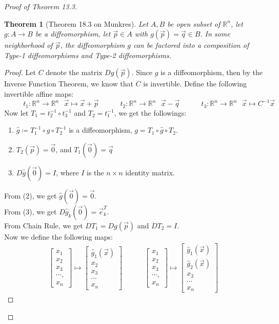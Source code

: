 \documentclass[15pt]{book}
\theoremstyle{break}
\theoremstyle{break}
\newtheorem{thm}{Theorem}[section]
\newcommand{\R}{\mathbb{R}}
\newcommand{\bmat}[1]{\begin{bmatrix} #1 \end{bmatrix}}
\begin{document}
\begin{proof}[Proof of Theorem 13.3]
\begin{thm}[Theorem 18.3 on Munkres]\setlength{\leftskip}{1cm}
Let $A,B$ be open subset of $\R^n$, let $g:A \to B$ be a diffeomorphism, let $\vec{p}\in A$ with $g(\vec{p}) = \vec{q}\in B$. In some neighborhood of $\vec{p}$, the diffeomorphism $g$ can be factored into a composition of Type-1 diffeomorphisms and Type-2 diffeomorphisms. 
\end{thm}
\begin{proof}\setlength{\leftskip}{1cm}
Let $C$ denote the matrix $Dg(\vec{p})$. Since $g$ is a diffeomorphism, then by the Inverse Function Theorem, we know that $C$ is invertible. Define the following invertible affine maps:
$$\ \ \ \qquad t_1:\R^n \to \R^n\ \ \ \vec{x}\mapsto\vec{x}+\vec{p} \quad\qquad t_2:\R^n \to \R^n \ \ \ \vec{x}-\vec{q}\quad\qquad t_3:\R^n \to \R^n \ \ \ \vec{x}\mapsto C^{-1}\vec{x}$$
\newpage
Now let $T_1=t_2^{-1}\circ t_3^{-1}$ and $T_2=t_1^{-1}$, we get the followings:
\begin{enumerate}[topsep=3pt,itemsep=-1ex,partopsep=1ex,parsep=1ex,leftmargin=2cm]
\item $\hat{g} \coloneqq T_1^{-1} \circ g \circ T_2^{-1}$ is a diffeomorphism, $g = T_1 \circ \hat{g} \circ T_2$.
\item $T_2(\vec{p}) = \vec{0}$, and $T_1(\vec{0}) = \vec{q}$
\item $D\hat{g}(\vec{0}) = I $, where $I$ is the $n \times n$ identity matrix.
\end{enumerate}
From (2), we get $\hat{g}(\vec{0}) = \vec{0}$. \\
From (3), we get $D\hat{g}_k(\vec{0}) = \vec{e}_k^T$.\\
From Chain Rule, we get $DT_1= Dg(\vec{p})$ and $DT_2 = I$. \\ 
Now we define the following maps:
\begin{align*}
\quad\qquad
\bmat{x_1\\x_2\\x_3\\\cdots,\\x_n} \mapsto \bmat{\hat{g}_1(\vec{x})\\x_2\\x_3\\\cdots \\x_n} \quad\qquad
\bmat{x_1\\x_2\\x_3\\\cdots,\\x_n}\mapsto \bmat{\hat{g}_1(\vec{x})\\\hat{g}_2(\vec{x})\\x_3\\\cdots\\ x_n} \quad\qquad

\end{align*}
\end{proof}
\end{proof}
\end{document}

